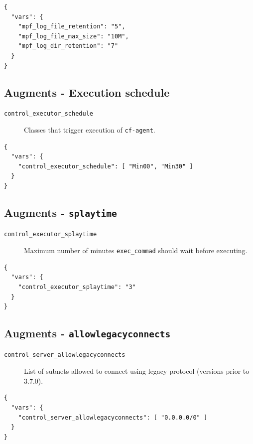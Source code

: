 \documentclass[11pt]{article}
\begin{document}
\begin{verbatim}
{
  "vars": {
    "mpf_log_file_retention": "5",
    "mpf_log_file_max_size": "10M",
    "mpf_log_dir_retention": "7"
  }
}
\end{verbatim}

\subsection*{Augments - Execution schedule}
\label{sec:org90c9b0f}

\begin{description}
\item[{\texttt{control\_executor\_schedule}}] Classes that trigger execution of \texttt{cf-agent}.
\end{description}

\begin{verbatim}
{
  "vars": {
    "control_executor_schedule": [ "Min00", "Min30" ]
  }
}
\end{verbatim}

\subsection*{Augments - \texttt{splaytime}}
\label{sec:orgcf916a9}

\begin{description}
\item[{\texttt{control\_executor\_splaytime}}] Maximum number of minutes \texttt{exec\_commad} should
wait before executing.
\end{description}

\begin{verbatim}
{
  "vars": {
    "control_executor_splaytime": "3"
  }
}
\end{verbatim}

\subsection*{Augments - \texttt{allowlegacyconnects}}
\label{sec:org270f0a1}

\begin{description}
\item[{\texttt{control\_server\_allowlegacyconnects}}] List of subnets allowed to connect
using legacy protocol (versions prior to 3.7.0).
\end{description}

\begin{verbatim}
{
  "vars": {
    "control_server_allowlegacyconnects": [ "0.0.0.0/0" ]
  }
}
\end{verbatim}
\end{document}
